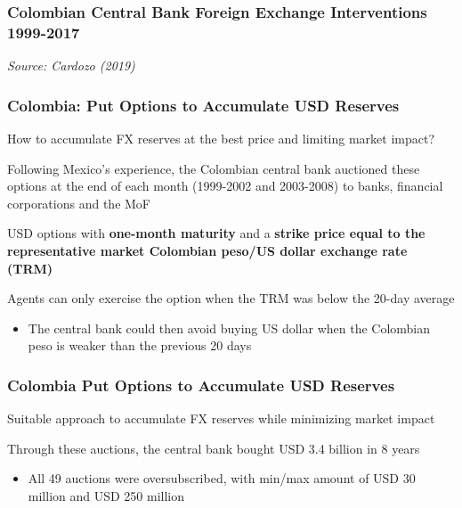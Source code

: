 \documentclass{beamer}
\newenvironment{wideitemize}{\itemize\addtolength{\itemsep}{10pt}}{\enditemize}
\begin{document}
\begin{frame}
\frametitle{Colombian Central Bank Foreign Exchange Interventions 1999-2017}
\medskip
\emph{Source: Cardozo (2019)}
\end{frame}

\begin{frame}
  \frametitle{Colombia: Put Options to Accumulate USD Reserves}
  \begin{wideitemize}
    \item How to accumulate FX reserves at the best price and limiting market impact?
    \item Following Mexico's experience, the Colombian central bank auctioned these options at the end of each month (1999-2002 and 2003-2008) to banks, financial corporations and the MoF
    \item USD options with \textbf{one-month maturity} and a \textbf{strike price equal to the representative market Colombian peso/US dollar exchange rate (TRM)}
    \item Agents can only exercise the option when the TRM was below the 20-day average
      \begin{itemize}
      \item The central bank could then avoid buying US dollar when the Colombian peso is weaker than the previous 20 days
      \end{itemize}      
  \end{wideitemize}
\end{frame}


\begin{frame}
  \frametitle{Colombia Put Options to Accumulate USD Reserves}

  \begin{wideitemize}
    \item Suitable approach to accumulate FX reserves while minimizing market impact
    \item Through these auctions, the central bank bought USD 3.4 billion in 8 years
      \begin{itemize}
      \item All 49 auctions were oversubscribed, with min/max amount of USD 30 million and USD 250 million
      \end{itemize}
  \end{wideitemize}

\end{frame}
\end{document}

